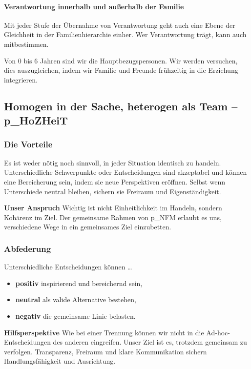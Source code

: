 \paragraph{Verantwortung innerhalb und außerhalb der Familie}

Mit jeder Stufe der Übernahme von Verantwortung geht auch eine Ebene der Gleichheit in der Familienhierarchie einher. Wer Verantwortung trägt, kann auch mitbestimmen.

Von 0 bis 6 Jahren sind wir die Hauptbezugspersonen. Wir werden versuchen, dies auszugleichen, indem wir Familie und Freunde frühzeitig in die Erziehung integrieren.

\subsection{Homogen in der Sache, heterogen als Team – \gls{p_HoZHeiT}}
\label{subsec_LeitendePrinzipien_Vier}

\subsubsection{Die Vorteile}  
Es ist weder nötig noch sinnvoll, in jeder Situation identisch zu handeln. Unterschiedliche Schwerpunkte oder Entscheidungen sind akzeptabel und können eine Bereicherung sein, indem sie neue Perspektiven eröffnen. Selbst wenn Unterschiede neutral bleiben, sichern sie Freiraum und Eigenständigkeit.

\textbf{Unser Anspruch}  
Wichtig ist nicht Einheitlichkeit im Handeln, sondern Kohärenz im Ziel. Der gemeinsame Rahmen von \gls{p_NFM} erlaubt es uns, verschiedene Wege in ein gemeinsames Ziel einzubetten.

\subsubsection{Abfederung}

Unterschiedliche Entscheidungen können …  
\begin{itemize}
    \item \textbf{positiv} inspirierend und bereichernd sein,  
    \item \textbf{neutral} als valide Alternative bestehen,  
    \item \textbf{negativ} die gemeinsame Linie belasten.  
\end{itemize}

\textbf{Hilfsperspektive}  
Wie bei einer Trennung können wir nicht in die Ad-hoc-Entscheidungen des anderen eingreifen. Unser Ziel ist es, trotzdem gemeinsam \NFMOThree zu verfolgen. Transparenz, Freiraum und klare Kommunikation sichern Handlungsfähigkeit und Ausrichtung.

